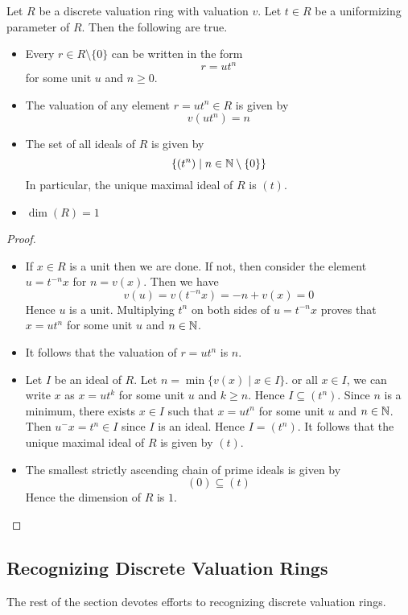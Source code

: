 \documentclass[a4paper]{article}
\begin{document}
\begin{prp}{}{} Let $R$ be a discrete valuation ring with valuation $v$. Let $t\in R$ be a uniformizing parameter of $R$. Then the following are true. 
\begin{itemize}
\item Every $r\in R\setminus\{0\}$ can be written in the form $$r=ut^n$$ for some unit $u$ and $n\geq 0$. 
\item The valuation of any element $r=ut^n\in R$ is given by $$v(ut^n)=n$$
\item The set of all ideals of $R$ is given by $$\{(t^n)\;|\;n\in\mathbb{N}\setminus\{0\}\}$$ In particular, the unique maximal ideal of $R$ is $(t)$. 
\item $\dim(R)=1$
\end{itemize} \tcbline
\begin{proof}~\\
\begin{itemize}
\item If $x\in R$ is a unit then we are done. If not, then consider the element $u=t^{-n}x$ for $n=v(x)$. Then we have $$v(u)=v(t^{-n}x)=-n+v(x)=0$$ Hence $u$ is a unit. Multiplying $t^n$ on both sides of $u=t^{-n}x$ proves that $x=ut^n$ for some unit $u$ and $n\in\mathbb{N}$. 
\item It follows that the valuation of $r=ut^n$ is $n$. 
\item Let $I$ be an ideal of $R$. Let $n=\min\{v(x)\;|\;x\in I\}$. or all $x\in I$, we can write $x$ as $x=ut^k$ for some unit $u$ and $k\geq n$. Hence $I\subseteq(t^n)$. Since $n$ is a minimum, there exists $x\in I$ such that $x=ut^n$ for some unit $u$ and $n\in\mathbb{N}$. Then $u^{-}x=t^n\in I$ since $I$ is an ideal. Hence $I=(t^n)$. It follows that the unique maximal ideal of $R$ is given by $(t)$. 
\item The smallest strictly ascending chain of prime ideals is given by $$(0)\subseteq (t)$$ Hence the dimension of $R$ is $1$. 
\end{itemize}
\end{proof}
\end{prp}

\subsection{Recognizing Discrete Valuation Rings}
The rest of the section devotes efforts to recognizing discrete valuation rings. 
\end{document}
